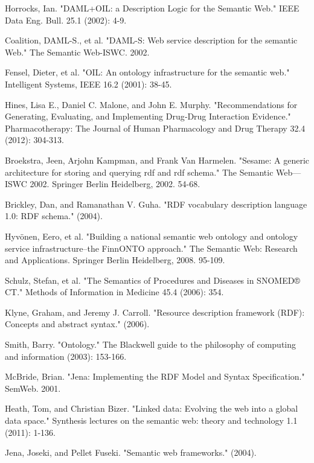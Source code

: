 \documentclass{article}
\begin{document}
\begin{thebibliography}{9}
  Horrocks, Ian. 
  "DAML+OIL: a Description Logic for the Semantic Web." 
  IEEE Data Eng. Bull. 25.1 
  (2002): 4-9.

  Coalition, DAML-S., et al. 
  "DAML-S: Web service description for the semantic Web." 
  The Semantic Web-ISWC. 2002.

  Fensel, Dieter, et al. 
  "OIL: An ontology infrastructure for the semantic web."
  Intelligent Systems, IEEE 16.2 
  (2001): 38-45.

  Hines, Lisa E., Daniel C. Malone, and John E. Murphy. "Recommendations for
  Generating, Evaluating, and Implementing Drug‐Drug Interaction Evidence."
  Pharmacotherapy: The Journal of Human Pharmacology and Drug Therapy 32.4
  (2012): 304-313.

Broekstra, Jeen, Arjohn Kampman, and Frank Van Harmelen. "Sesame: A generic
architecture for storing and querying rdf and rdf schema." The Semantic Web—ISWC
2002. Springer Berlin Heidelberg, 2002. 54-68.

  Brickley, Dan, and Ramanathan V. Guha. 
  "RDF vocabulary description language 1.0: RDF schema." 
  (2004).

  Hyvönen, Eero, et al. "Building a national semantic web ontology and ontology
  service infrastructure–the FinnONTO approach." The Semantic Web: Research and
  Applications. Springer Berlin Heidelberg, 2008. 95-109.

  Schulz, Stefan, et al. "The Semantics of Procedures and Diseases in SNOMED®
  CT." Methods of Information in Medicine 45.4 (2006): 354.

  Klyne, Graham, and Jeremy J. Carroll. 
  "Resource description framework (RDF): Concepts and abstract syntax." 
  (2006).

  Smith, Barry. 
  "Ontology." 
  The Blackwell guide to the philosophy of computing and information 
  (2003): 153-166.

  McBride, Brian. 
  "Jena: Implementing the RDF Model and Syntax Specification."
  SemWeb. 
  2001.

  Heath, Tom, and Christian Bizer. 
  "Linked data: Evolving the web into a global data space." 
  Synthesis lectures on the semantic web: theory and technology 1.1
  (2011): 1-136.

  Jena, Joseki, and Pellet Fuseki. 
  "Semantic web frameworks." 
  (2004).


\end{thebibliography}
\end{document}
